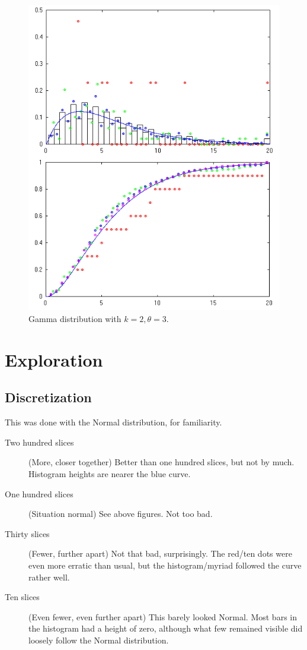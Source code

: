 \documentclass[letterpaper]{article}
\begin{document}
\begin{figure}[ht]
  \centering
  \includegraphics[width=\columnwidth]{2015-11-11_gamma.png}
  \caption{\label{fig:dGamma} Gamma distribution with $k=2, \theta=3$.}
\end{figure}
 
\section{Exploration}
\label{sec:expl}

\subsection{Discretization}
\label{subsec:discrete}

This was done with the Normal distribution, for familiarity.

\begin{description}
\item[Two hundred slices] (More, closer together) Better than one hundred
  slices, but not by much.  Histogram heights are nearer the blue curve.
\item[One hundred slices] (Situation normal) See above figures.  Not too bad.
\item[Thirty slices] (Fewer, further apart) Not that bad, surprisingly.  The
  red/ten dots were even more erratic than usual, but the histogram/myriad
  followed the curve rather well.
\item[Ten slices] (Even fewer, even further apart) This barely looked Normal.
  Most bars in the histogram had a height of zero, although what few remained
  visible did loosely follow the Normal distribution.
\end{description}
\end{document}
